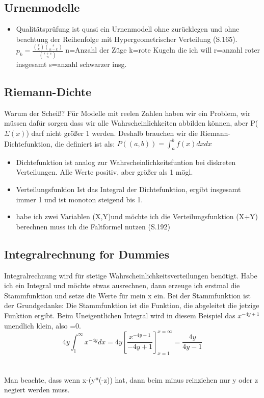 \documentclass[10pt,a4paper]{article}
\begin{document}
	\subsection{Urnenmodelle}
		\begin{itemize}
			\item Qualitätsprüfung ist quasi ein Urnenmodell ohne zurücklegen und ohne beachtung der Reihenfolge mit Hypergeometrischer Verteilung (S.165). $p_k=\frac{\binom{r}{k}\binom{s}{n-k}}{\binom{r+s}{n}}$ n=Anzahl der Züge k=rote Kugeln die ich will r=anzahl roter insgesamt s=anzahl schwarzer insg.
		\end{itemize}
	\subsection{Riemann-Dichte}
	Warum der Scheiß? Für Modelle mit reelen Zahlen haben wir ein Problem, wir müssen dafür sorgen dass wir alle Wahrscheinlichkeiten abbilden können, aber P($\Sigma(x)$) darf nicht größer 1 werden. Deshalb brauchen wir die Riemann-Dichtefunktion, die definiert ist als:  $P((a,b))=\int_{a}^{b} f(x)dx dx$ 
	\begin{itemize}
		\item Dichtefunktion ist analog zur Wahrscheinlichkeitsfuntion bei diskreten Verteilungen. Alle Werte positiv, aber größer als 1 mögl.
		\item Verteilungsfunkion Ist das Integral der Dichtefunktion, ergibt insgesamt immer 1 und ist monoton steigend bis 1.
		\item habe ich zwei Variablen (X,Y)und möchte ich die Verteilungsfunktion (X+Y) berechnen muss ich die Faltformel nutzen (S.192)
	\end{itemize}
	\subsection{Integralrechnung for Dummies}
	Integralrechnung wird für stetige Wahrscheinlichkeitsverteilungen benötigt. Habe ich ein Integral und möchte etwas ausrechnen, dann erzeuge ich erstmal die Stammfunktion und setze die Werte für mein x ein. Bei der Stammfunktion ist der Grundgedanke: Die Stammfunktion ist die Funktion, die abgeleitet die jetzige Funktion ergibt. Beim Uneigentlichen Integral wird in diesem Beispiel das $x^{-4y+1}$ unendlich klein, also =0. $$4y \int_{1}^{\infty}x^{-4y}dx = 4y \left[ \frac{x^{-4y+1}}{-4y+1}\right]_{x=1}^{x=\infty} = \frac{4y}{4y-1}$$ \\~\\Man beachte, dass wenn x-(y*(-z)) hat, dann beim minus reinziehen nur y oder z negiert werden muss.
 
\end{document}
